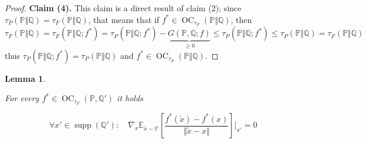 \documentclass{article}
\DeclareMathOperator{\supp}{supp}
\DeclareMathOperator{\oc}{OC}
\newtheorem{lemma}{Lemma}
\begin{document}
\begin{proof}
\noindent\textbf{Claim (4). }
This claim is a direct result of claim (2); since $\tau_P(\mathbb P\Vert\mathbb Q)=\tau_F(\mathbb P\Vert\mathbb Q)$,
that means that if $f^*\in\oc_{\tau_F}(\mathbb P\Vert\mathbb Q)$, then
\[\tau_F(\mathbb P\Vert\mathbb Q)=\tau_F(\mathbb P\Vert\mathbb Q;f^*)=\tau_P(\mathbb P\Vert\mathbb Q;f^*)-\underbrace{G(\mathbb P,\mathbb Q;f)}_{\geq 0}\leq \tau_P(\mathbb P\Vert\mathbb Q;f^*)\leq \tau_P(\mathbb P\Vert\mathbb Q)=\tau_F(\mathbb P\Vert\mathbb Q)\]
thus $\tau_P(\mathbb P\Vert\mathbb Q;f^*)= \tau_P(\mathbb P\Vert\mathbb Q)$ and $f^*\in\oc_{\tau_P}(\mathbb P\Vert\mathbb Q)$.
\end{proof}

\begin{lemma}\label{L:first_order_helper}


For every $f^*\in\oc_{\tau_F}(\mathbb P,\mathbb Q')$ it holds


\begin{equation}\label{E:slope_p_last}
 \forall x'\in\supp(\mathbb Q'):\quad \nabla_x\mathbb E_{\tilde x\sim\mathbb P}\left[\frac{f^*(\tilde x)-f^*(x)}{\Vert \tilde x - x\Vert}\right]\bigg|_{x'}=0
\end{equation}


\end{lemma}
\end{document}
